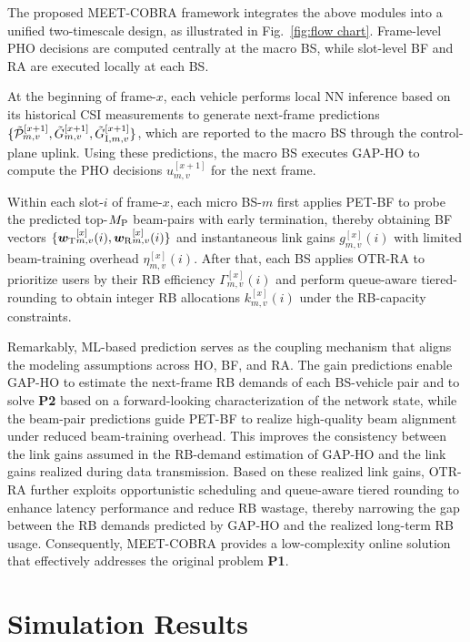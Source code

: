 \documentclass[conference, a4paper]{IEEEtran}
\theoremstyle{remark}
\begin{document}
\fi

The proposed MEET-COBRA framework integrates the above modules into a unified two-timescale design, as illustrated in Fig.~\ref{fig:flow chart}.
Frame-level PHO decisions are computed centrally at the macro BS, while slot-level BF and RA are executed locally at each BS. 

At the beginning of frame-$x$, each vehicle performs local NN inference based on its historical CSI measurements to generate next-frame predictions $\{\Tilde{\mathcal{P}}_{m,v}^{[x+1]}, \Tilde{G}_{m,v}^{[x+1]}, \Tilde{G}_{{\rm I},m,v}^{[x+1]}\}$, which are reported to the macro BS through the control-plane uplink. Using these predictions, the macro BS executes GAP-HO to compute the PHO decisions $u_{m,v}^{[x+1]}$ for the next frame.

Within each slot-$i$ of frame-$x$, each micro BS-$m$ first applies PET-BF to probe the predicted top-$M_{\rm P}$ beam-pairs with early termination, thereby obtaining BF vectors $\{{\bm{w}_{\rm T}}_{m,v}^{[x]}(i), {\bm{w}_{\rm R}}_{m,v}^{[x]}(i)\}$ and instantaneous link gains $g_{m,v}^{[x]}(i)$ with limited beam-training overhead $\eta_{m,v}^{[x]}(i)$. 
After that, each BS applies OTR-RA to prioritize users by their RB efficiency $\Gamma_{m,v}^{[x]}(i)$ and perform queue-aware tiered-rounding to obtain integer RB allocations $k_{m,v}^{[x]}(i)$ under the RB-capacity constraints.

Remarkably, ML-based prediction serves as the coupling mechanism that aligns the modeling assumptions across HO, BF, and RA. The gain predictions enable GAP-HO to estimate the next-frame RB demands of each BS-vehicle pair and to solve \textbf{P2} based on a forward-looking characterization of the network state, while the beam-pair predictions guide PET-BF to realize high-quality beam alignment under reduced beam-training overhead. This improves the consistency between the link gains assumed in the RB-demand estimation of GAP-HO and the link gains realized during data transmission. Based on these realized link gains, OTR-RA further exploits opportunistic scheduling and queue-aware tiered rounding to enhance latency performance and reduce RB wastage, thereby narrowing the gap between the RB demands predicted by GAP-HO and the realized long-term RB usage. Consequently, MEET-COBRA provides a low-complexity online solution that effectively addresses the original problem \textbf{P1}.


\section{Simulation Results}
\end{document}
